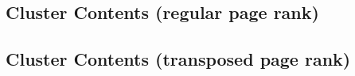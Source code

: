 \documentclass{article}
\begin{document}
\subsection{Cluster Contents (regular page rank)}
\newpage\subsection{Cluster Contents (transposed page rank)}
\end{document}
